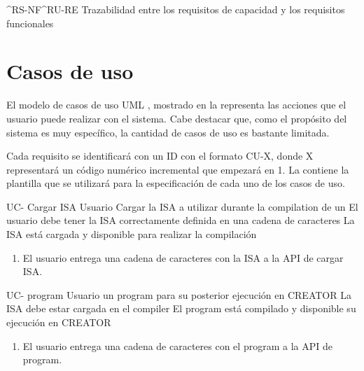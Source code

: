     {^RS-NF}{^RU-RE}
    {Trazabilidad entre los requisitos de capacidad y los requisitos funcionales}

\FloatBarrier

\section{Casos de uso}\label{sec:usecases}

El modelo de casos de uso UML \parencite{UMLSpec}, mostrado en la  representa las
acciones que el usuario puede realizar con el sistema. Cabe destacar que, como
el propósito del sistema es muy específico, la cantidad de casos de uso es
bastante limitada.


Cada requisito se identificará con un ID con el formato CU-X, donde X
representará un código numérico incremental que empezará en 1. La
 contiene la plantilla que se utilizará para la
especificación de cada uno de los casos de uso.


\setcounter{i}{1}


\begin{useCase}{UC-}
    {Cargar \gls{ISA}} %
    {Usuario} %
    {Cargar la \gls{ISA} a utilizar durante la \gls{compilation} de un } %
    {El usuario debe tener la \gls{ISA} correctamente definida en una cadena de caracteres} %
    {La \gls{ISA} está cargada y disponible para realizar la compilación} %
    \begin{enumerate}[leftmargin=*, topsep=0pt, noitemsep]
        \item El usuario entrega una cadena de caracteres con la
        \gls{ISA} a la \gls{API} de cargar \gls{ISA}.
    \end{enumerate}
\end{useCase}

\begin{useCase}{UC-}
    { \gls{program}} %
    {Usuario} %
    { un \gls{program} para su posterior ejecución en CREATOR} %
    {La \gls{ISA} debe estar cargada en el \gls{compiler}} %
    {El \gls{program} está compilado y disponible su ejecución en CREATOR} %
    \begin{enumerate}[leftmargin=*, topsep=0pt, noitemsep]
        \item El usuario entrega una cadena de caracteres con el \gls{program}
        a la \gls{API} de  \gls{program}.
    \end{enumerate}
\end{useCase}
